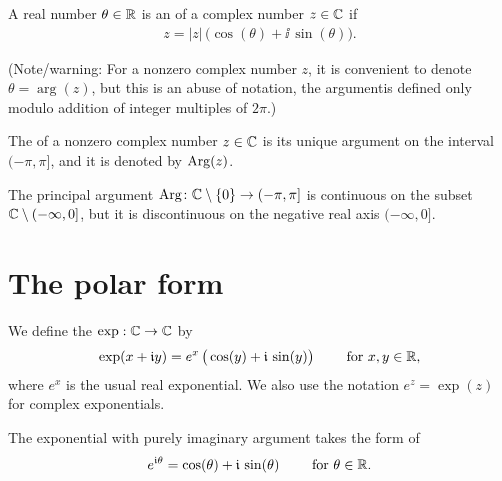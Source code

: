 \begin{definition}
  \label{def:argument}
  A real number $\theta \in \mathbb{R}$ is an  of a complex
  number $z \in \mathbb{C}$ if
  \begin{align*}
    z = |z| \, \Big( \cos (\theta) + \ii \, \sin (\theta) \Big) .
  \end{align*}

  (Note/warning: For a nonzero complex number $z$,
  it is convenient to denote $\theta = \arg(z)$,
  but this is an abuse of notation, the argumentis defined only
  modulo addition of integer multiples of $2 \pi$.)

  The  of a nonzero complex number $z \in \mathbb{C}$
  is its unique argument on the interval $(-\pi, \pi]$, and it is denoted
  by $\mathrm{Arg}(z)$.
\end{definition}


\begin{lemma}
  \label{lem:discontinuity_of_principal_arg}
  The principal argument
  $\mathrm{Arg} \colon \mathbb{C} \setminus \left\{ 0 \right\} \to (-\pi,\pi]$
  is continuous on the subset $\mathbb{C} \setminus (-\infty,0]$, but it is
  discontinuous on the negative real axis $(-\infty,0]$.
\end{lemma}


\section{The polar form}

\begin{definition}
  \label{def:complex_exp}
  We define the  $\exp : \mathbb{C} \to \mathbb{C}$ by
  \begin{align*}
    \exp(x + \mathfrak{i} y) = e^x \, \big( \cos(y) + \mathfrak{i} \, \sin(y) \big)
    \qquad \text{ for } x,y \in \mathbb{R} ,
  \end{align*}
  where $e^x$ is the usual real exponential.
  We also use the notation $e^z = \exp(z)$ for complex exponentials.

  The exponential with purely imaginary argument takes the
  form of 
  \begin{align*}
    e^{\mathfrak{i} \theta} = \cos(\theta) + \mathfrak{i} \, \sin(\theta)
    \qquad \text{ for } \theta \in \mathbb{R} .
  \end{align*}
\end{definition}

